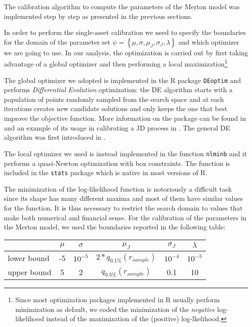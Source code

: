 The calibration algorithm to compute the parameters of the Merton model was implemented step by step as presented in the previous sections.

In order to perform the single-asset calibration we need to specify the boundaries for the domain of the parameter set $\psi =  \left\{ \mu, \sigma, \mu_J, \sigma_J, \lambda \right\}$ and which optimizer we are going to use.
In our analysis, the optimization is carried out by first taking advantage of a global optimizer and then performing a local maximization\footnote{Since most optimization packages implemented in R usually perform minimization as default, we coded the minimization of the \textit{negative} log-likelihood instead of the maximization of the (positive) log-lkelihood.}

The global optimizer we adopted is implemented in the R package \texttt{DEoptim} and performs \textit{Differential Evolution} optimization: the DE algorithm starts with a population of points randomly sampled from the search space and at each iterations creates new candidate solutions and only keeps the one that best improve the objective function. More information on the package can be found in \cite{DEoptim_manual} and an example of its usage in calibrating a JD process in \cite{DEoptim_jumpdiffusion}. The general DE algorithm was first introduced in \cite{DEoptim_book}.

The local optimizer we used is instead implemented in the function \texttt{nlminb} and it performs a quasi-Newton optimization with box constraints. The function is included in the \texttt{stats} package which is native in most versions of R.

The minimization of the log-likelihood function is notoriously a difficult task since its shape has many different maxima and most of them have similar values for the function. It is thus necessary to restrict the search domain to values that make both numerical and financial sense.
For the calibration of the parameters in the Merton model, we used the  boundaries reported in the following table:
\bigskip

\begin{center}
	\begin{tabular}{lccccc}
		
		&$\mu$ & $\sigma$ & $\mu_J$ & $\sigma_J$ & $\lambda$ \\
		\midrule
		lower bound & -5 & $10^{-5}$ & $2*q_{0.1\%}(r_{sample})$ &$10^{-4}$ &$10^{-5}$\\
		upper bound & 5 & 2 & $q_{0.5\%}(r_{sample})$ & 0.1& 10\\
		\midrule
	\end{tabular}
\end{center}



